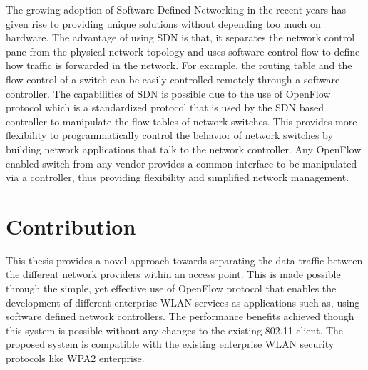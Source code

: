 The growing adoption of Software Defined Networking in the recent years has given rise to providing unique solutions without depending too much on hardware. The advantage of using SDN is that, it separates the network control pane from the physical network topology and uses software control flow to define how traffic is forwarded in the network. For example, the routing table and the flow control of a switch can be easily controlled remotely through a software controller.  The capabilities of SDN is possible due to the use of OpenFlow protocol which is a standardized protocol that is used by the SDN based controller to manipulate the flow tables of network switches. This provides more flexibility to programmatically control the behavior of network switches by building network applications that talk to the network controller. Any OpenFlow enabled switch from any vendor provides a common interface to be manipulated via a controller, thus providing flexibility and simplified network management.


\section{Contribution}\label{sec:contribution}

This thesis provides a novel approach towards separating the data traffic between the different network providers within an access point. This is made possible through the simple, yet effective use of OpenFlow protocol that enables the development of different enterprise WLAN services as applications such as, using software defined network controllers. The performance benefits achieved though this system is possible without any changes to the existing 802.11 client. The proposed system is compatible with the existing enterprise WLAN security protocols like WPA2 enterprise.

